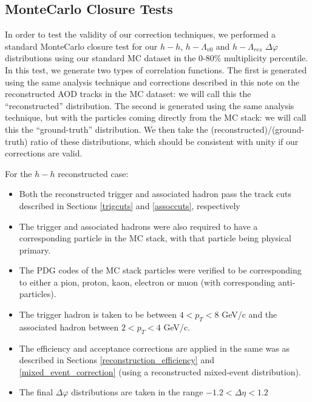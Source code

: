\documentclass[ALICE,manyauthors]{ALICE_analysis_notes}
\begin{document}
\clearpage

\subsection{MonteCarlo Closure Tests}
\label{mc_closure}
In order to test the validity of our correction techniques, we performed a standard MonteCarlo closure test for our $h-h$, $h-\Lambda_{v0}$ and $h-\Lambda_{res}$ $\Delta\varphi$ distributions using our standard MC dataset in the 0-80\% multiplicity percentile. In this test, we generate two types of correlation functions. The first is generated using the same analysis technique and corrections described in this note on the reconstructed AOD tracks in the MC dataset: we will call this the ``reconstructed'' distribution. The second is generated using the same analysis technique, but with the particles coming directly from the MC stack: we will call this the ``ground-truth'' distribution. We then take the (reconstructed)/(ground-truth) ratio of these distributions, which should be consistent with unity if our corrections are valid.

For the $h-h$ reconstructed case: 
\begin{itemize}
\item Both the reconstructed trigger and associated hadron pass the track cuts described in Sections \ref{trigcuts} and \ref{assoccuts}, respectively 
\item The trigger and associated hadrons were also required to have a corresponding particle in the MC stack, with that particle being physical primary.
\item The PDG codes of the MC stack particles were verified to be corresponding to either a pion, proton, kaon, electron or muon (with corresponding anti-particles).
\item The trigger hadron is taken to be between $4 < p_{T} < 8$ GeV/c and the associated hadron between $2 < p_{T} < 4$ GeV/c. 
\item The efficiency and acceptance corrections are applied in the same was as described in Sections \ref{reconstruction_efficiency} and \ref{mixed_event_correction} (using a reconstructed mixed-event distribution). 
\item The final $\Delta\varphi$ distributions are taken in the range $-1.2 < \Delta\eta < 1.2$
\end{itemize}
\end{document}
